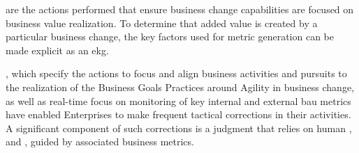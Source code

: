 %
%
 are the actions performed that ensure business change capabilities are
focused on business value realization.
To determine that added value is created by a particular business change, the key factors used for metric generation
can be made explicit as an \gls{ekg}.

, which specify the actions to focus and align
business activities and pursuits to the realization of the Business Goals Practices around Agility in
business change, as well as real-time focus on monitoring of key internal and external \gls{bau} metrics have enabled
Enterprises to make frequent tactical corrections in their activities.
A significant component of such corrections is a judgment that relies on human , 
and , guided by associated business metrics.

